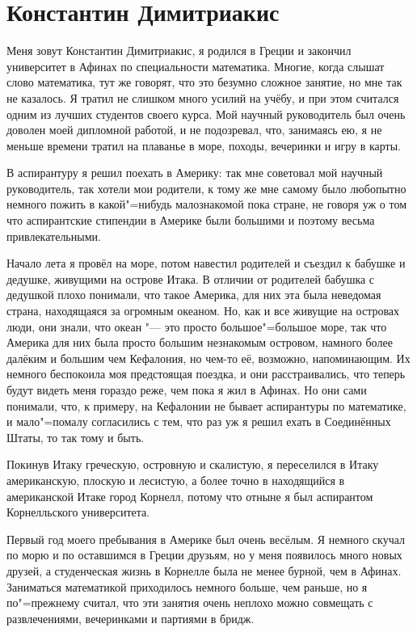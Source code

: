 \section{Константин Димитриакис}

Меня зовут Константин Димитриакис, я родился в Греции и закончил университет в
Афинах по специальности математика.
Многие, когда слышат слово математика, тут же говорят, что это безумно сложное
занятие, но мне так не казалось.
Я тратил не слишком много усилий на учёбу, и при этом считался одним из лучших
студентов своего курса.
Мой научный руководитель был очень доволен моей дипломной работой, и не
подозревал, что, занимаясь ею, я не меньше времени тратил на плаванье в море,
походы, вечеринки и игру в карты.

В аспирантуру я решил поехать в Америку: так мне советовал мой научный
руководитель, так хотели мои родители, к тому же мне самому было любопытно
немного пожить в какой"=нибудь малознакомой пока стране, не говоря уж о том что
аспирантские стипендии в Америке были большими и поэтому весьма привлекательными.

Начало лета я провёл на море, потом навестил родителей и съездил к бабушке и
дедушке, живущими на острове Итака.
В отличии от родителей бабушка с дедушкой плохо понимали, что такое Америка, для
них эта была неведомая страна, находящаяся за огромным океаном.
Но, как и все живущие на островах люди, они знали, что океан "--- это просто
большое"=большое море, так что Америка для них была просто большим незнакомым
островом, намного более далёким и большим чем Кефалония, но чем-то её, возможно,
напоминающим.
Их немного беспокоила моя предстоящая поездка, и они расстраивались, что теперь
будут видеть меня гораздо реже, чем пока я жил в Афинах. Но они сами понимали,
что, к примеру, на Кефалонии не бывает аспирантуры по математике, и мало"=помалу
согласились с тем, что раз уж я решил ехать в Соединённых Штаты, то так тому и
быть.

Покинув Итаку греческую, островную и скалистую, я переселился в Итаку
американскую, плоскую и лесистую, а более точно в находящийся в американской
Итаке город Корнелл, потому что отныне я был аспирантом Корнелльского
университета.

Первый год моего пребывания в Америке был очень весёлым.
Я немного скучал по морю и по оставшимся в Греции друзьям, но у меня появилось
много новых друзей, а студенческая жизнь в Корнелле была не менее бурной, чем в
Афинах.
Заниматься математикой приходилось немного больше, чем раньше, но я по"=прежнему
считал, что эти занятия очень неплохо можно совмещать с развлечениями,
вечеринками и партиями в бридж.

